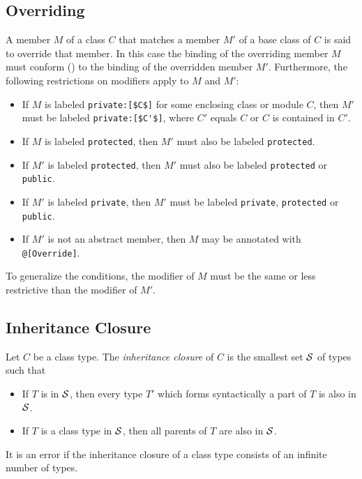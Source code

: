 \subsection{Overriding}
\label{sec:overriding}

A member $M$ of a class $C$ that matches a member $M'$ of a base class of $C$ is said to override that member. In this case the binding of the overriding member $M$ must conform () to the binding of the overridden member $M'$. Furthermore, the following restrictions on modifiers apply to $M$ and $M'$: 
\begin{itemize}
\item If $M$ is labeled \lstinline!private:[$C$]! for some enclosing class or module $C$, then $M'$ must be labeled \lstinline!private:[$C'$]!, where $C'$ equals $C$ or $C$ is contained in $C'$. %
\item If $M$ is labeled \lstinline!protected!, then $M'$ must also be labeled \lstinline!protected!. 
\item If $M'$ is labeled \lstinline!protected!, then $M'$ must also be labeled \lstinline!protected! or \lstinline!public!. 
\item If $M'$ is labeled \lstinline!private!, then $M'$ must be labeled \lstinline!private!, \lstinline!protected! or \lstinline!public!. 
\item If $M'$ is not an abstract member, then $M$ may be annotated with \lstinline!@[Override]!. 
\end{itemize}

To generalize the conditions, the modifier of $M$ must be the same or less restrictive than the modifier of $M'$. 

\subsection{Inheritance Closure}
\label{sec:inheritance-closure}

\newcommand{\inheritclosure}{{\cal S}}

Let $C$ be a class type. The {\em inheritance closure} of $C$ is the smallest set $\inheritclosure$ of types such that
\begin{itemize}
\item If $T$ is in $\inheritclosure$, then every type $T'$ which forms syntactically a part of $T$ is also in $\inheritclosure$. 
\item If $T$ is a class type in $\inheritclosure$, then all parents of $T$ are also in $\inheritclosure$. 
\end{itemize}
It is an error if the inheritance closure of a class type consists of an infinite number of types. 


